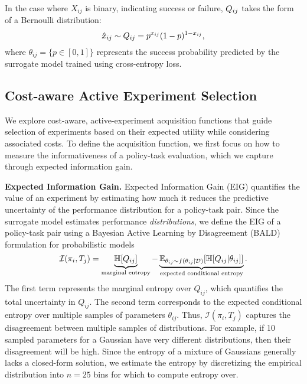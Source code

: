 In the case where $X_{ij}$ is binary, indicating success or failure, $Q_{ij}$ takes the form of a Bernoulli distribution:
\begin{equation}
    \hat{x}_{ij} \sim Q_{ij} =  p^{x_{ij}}(1-p)^{1-x_{ij}},
\end{equation}
where $\theta_{ij} = \{p \in [0,1] \}$ represents the success probability predicted by the surrogate model trained using cross-entropy loss. 



\subsection{Cost-aware Active Experiment Selection}

We explore cost-aware, active-experiment acquisition functions that guide selection of experiments based on their expected utility while considering associated costs.
To define the acquisition function, we first focus on how to measure the informativeness of a policy-task evaluation, which we capture through expected information gain.

\textbf{Expected Information Gain.}
Expected Information Gain (EIG) quantifies the value of an experiment by estimating how much it reduces the predictive uncertainty of the performance distribution for a policy-task pair. 
Since the surrogate model estimates performance \textit{distributions}, we define the EIG of a policy-task pair using a Bayesian Active Learning by Disagreement (BALD)~\cite{houlsby2011bayesian} formulation for probabilistic models
\begin{equation}
    \mathcal{I}(\pi_i, T_j) = \underbrace{\mathbb{H}[Q_{ij}]}_{\text{marginal entropy}} - \underbrace{\mathbb{E}_{\theta_{ij} \sim f(\theta_{ij}|\mathcal{D})} [\mathbb{H}[Q_{ij} | \theta_{ij}]]}_{\text{expected conditional entropy}}.
\end{equation}
The first term represents the marginal entropy over $Q_{ij}$, which quantifies the total uncertainty in $Q_{ij}$. 
The second term corresponds to the expected conditional entropy over multiple samples of parameters $\theta_{ij}$.
Thus, $\mathcal{I}(\pi_i, T_j)$ captures the disagreement between multiple samples of distributions.
For example, if 10 sampled parameters for a Gaussian have very different distributions, then their disagreement will be high.
Since the entropy of a mixture of Gaussians generally lacks a closed-form solution, we estimate the entropy by discretizing the empirical distribution into $n=25$ bins for which to compute entropy over.

